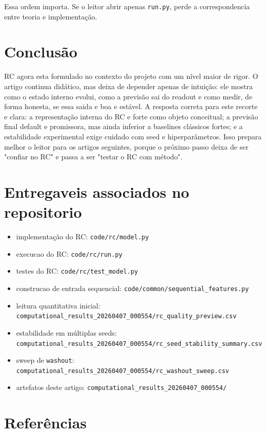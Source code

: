 \documentclass[12pt]{article}
\providecommand{\tightlist}{%
              \setlength{\itemsep}{0pt}\setlength{\parskip}{0pt}}
\begin{document}
Essa ordem importa. Se o leitor abrir apenas \texttt{run.py}, perde a correspondencia entre teoria e implementação.

\section{Conclusão}\label{16-conclusuxe3o}

RC agora esta formulado no contexto do projeto com um nível maior de rigor. O artigo continua didático, mas deixa de depender apenas de intuição: ele mostra como o estado interno evolui, como a previsão sai do readout e como medir, de forma honesta, se essa saida e boa e estável. A resposta correta para este recorte e clara: a representação interna do RC e forte como objeto conceitual; a previsão final default e promissora, mas ainda inferior a baselines clássicos fortes; e a estabilidade experimental exige cuidado com seed e hiperparâmetros. Isso prepara melhor o leitor para os artigos seguintes, porque o próximo passo deixa de ser "confiar no RC" e passa a ser "testar o RC com método".

\section*{Entregaveis associados no repositorio}\label{entregaveis-associados-no-repositorio}

\begin{itemize}
\tightlist
\item
  implementação do RC: \texttt{code/rc/model.py}
\item
  execucao do RC: \texttt{code/rc/run.py}
\item
  testes do RC: \texttt{code/rc/test\_model.py}
\item
  construcao de entrada sequencial: \texttt{code/common/sequential\_features.py}
\item
  leitura quantitativa inicial: \texttt{computational\_results\_20260407\_000554/rc\_quality\_preview.csv}
\item
  estabilidade em múltiplas seeds: \texttt{computational\_results\_20260407\_000554/rc\_seed\_stability\_summary.csv}
\item
  sweep de \texttt{washout}: \texttt{computational\_results\_20260407\_000554/rc\_washout\_sweep.csv}
\item
  artefatos deste artigo: \texttt{computational\_results\_20260407\_000554/}
\end{itemize}

\section{Referências}\label{referencias}
\end{document}
